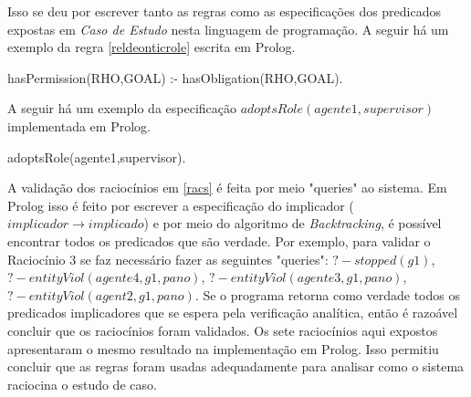 Isso se deu por escrever tanto as regras como as especificações dos predicados expostas em \textit{Caso de Estudo} nesta linguagem de programação. A seguir há um exemplo da regra \ref{reldeonticrole} escrita em Prolog.

hasPermission(RHO,GOAL) :- hasObligation(RHO,GOAL).

A seguir há um exemplo da especificação $adoptsRole(agente1,supervisor)$ implementada em Prolog.

adoptsRole(agente1,supervisor).

A validação dos raciocínios em \ref{racs} é feita por meio "queries" ao sistema. Em Prolog isso é feito por escrever a especificação do implicador ($implicador \to implicado$) e por meio do algoritmo de \textit{Backtracking}, é possível encontrar todos os predicados que são verdade. Por exemplo, para validar o Raciocínio 3 se faz necessário fazer as seguintes "queries": $? - stopped(g1)$, $? - entityViol(agente4,g1,pano)$, $? - entityViol(agente3,g1,pano)$, $? - entityViol(agent2,g1,pano)$. Se o programa retorna como verdade todos os predicados implicadores que se espera pela verificação analítica, então é razoável concluir que os raciocínios foram validados. Os sete raciocínios aqui expostos apresentaram o mesmo resultado na implementação em Prolog. Isso permitiu concluir que as regras foram usadas adequadamente para analisar como o sistema raciocina o estudo de caso. 
